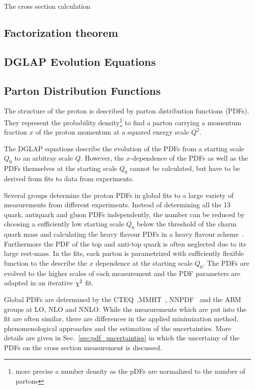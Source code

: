 The cross section calculation 

\subsection{Factorization theorem}


\subsection{DGLAP Evolution Equations}


\subsection{Parton Distribution Functions}

The structure of the proton is described by parton distribution functions
(PDFs).
They represent the probability density\footnote{more precise a number density as
the pDFs are normalized to the number of partons} to find a parton carrying a momentum
fraction $x$ of the proton momentum at a squared energy scale $Q^2$. 

The DGLAP equations describe the evolution of the PDFs from a starting scale
$Q_0$ to an arbitray scale $Q$. However, the $x$-dependence of the PDFs as well
as the PDFs themselves at the starting scale $Q_0$ cannot be calculated, but
have to be derived from fits to data from experiments.

Several groups determine the proton PDFs in global fits to a large variety of
measurements from different experiments. Instead of determining all the 13 quark,
antiquark and gluon PDFs independently, the number can be reduced by choosing a
sufficiently low starting scale $Q_0$ below the threshold of the charm quark
mass and calculating the heavy flavour PDFs in a heavy flavour
scheme~\cite{rt_scheme}. Furthermore the PDF of the top and anti-top quark is
often neglected due to its large rest-mass. In the fits, each parton is
parametrized with sufficiently flexible function to the describe the $x$
dependence at the starting scale $Q_0$. The PDFs are evolved to the higher
scales of each measurement and the PDF parameters are adapted in an iterative
$\chi^2$ fit.

Global PDFs are determined by the
CTEQ~\cite{Dulat:2015mca},MMHT~\cite{Harland-Lang:2014zoa},
NNPDF~\cite{Ball:2014uwa} and the ABM~\cite{Alekhin:2013nda} groups at LO, NLO
and NNLO. While the measurements which are put into the fit are often similar,
there are differences in the applied minimization method, phenomenological
approaches and the estimation of the uncertainties. More details are given in
Sec.~\ref{sec:pdf_uncertainties} in which the uncertainy of the PDFs on the
cross section measurement is discussed.

